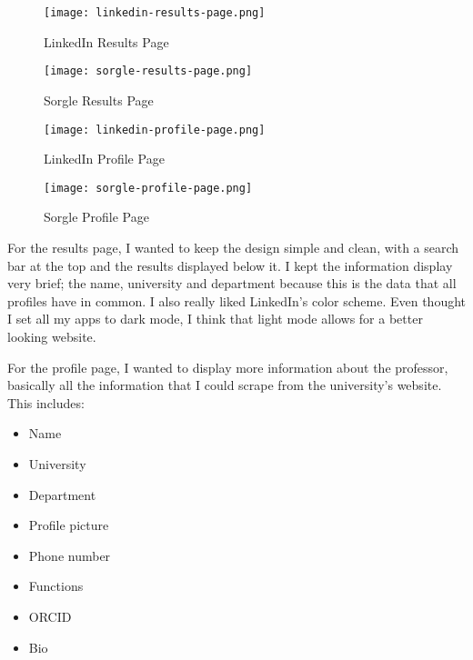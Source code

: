 \begin{figure}[ht]
	\centering
	\begin{minipage}{0.48\textwidth}
		\centering
		\texttt{[image: linkedin-results-page.png]}
		\caption{LinkedIn Results Page}
		\label{fig:linkedin_results_page}
	\end{minipage}\hfill
	\begin{minipage}{0.48\textwidth}
		\centering
		\texttt{[image: sorgle-results-page.png]}
		\caption{Sorgle Results Page}
		\label{fig:sorgle_results_page}
	\end{minipage}
\end{figure}

\begin{figure}[ht]
	\centering
	\begin{minipage}{0.48\textwidth}
		\centering
		\texttt{[image: linkedin-profile-page.png]}
		\caption{LinkedIn Profile Page}
		\label{fig:linkedin_profile_page}
	\end{minipage}\hfill
	\begin{minipage}{0.48\textwidth}
		\centering
		\texttt{[image: sorgle-profile-page.png]}
		\caption{Sorgle Profile Page}
		\label{fig:sorgle_profile_page}
	\end{minipage}
\end{figure}

For the results page, I wanted to keep the design simple and clean, with a search bar at the top and the results displayed below it. I kept the information display very brief; the name, university and department because this is the data that all profiles have in common. I also really liked LinkedIn's color scheme. Even thought I set all my apps to dark mode, I think that light mode allows for a better looking website.

For the profile page, I wanted to display more information about the professor, basically all the information that I could scrape from the university's website. This includes:
\begin{itemize}
	\item Name
	\item University
	\item Department
	\item Profile picture
	\item Phone number
	\item Functions
	\item ORCID
	\item Bio
\end{itemize}

